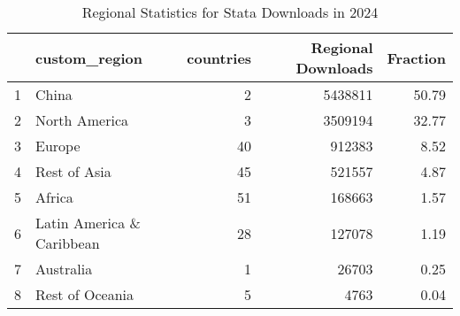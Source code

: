 \begin{table}[ht]
\centering
\begin{tabular}{rlrrr}
  \hline
 & custom\_region & countries & Regional Downloads & Fraction \\ 
  \hline
1 & China &   2 & 5438811 & 50.79 \\ 
  2 & North America &   3 & 3509194 & 32.77 \\ 
  3 & Europe &  40 & 912383 & 8.52 \\ 
  4 & Rest of Asia &  45 & 521557 & 4.87 \\ 
  5 & Africa &  51 & 168663 & 1.57 \\ 
  6 & Latin America \& Caribbean &  28 & 127078 & 1.19 \\ 
  7 & Australia &   1 & 26703 & 0.25 \\ 
  8 & Rest of Oceania &   5 & 4763 & 0.04 \\ 
   \hline
\end{tabular}
\caption{Regional Statistics for Stata Downloads in 2024} 
\label{tab:stata_downloads_regional_stats_2024}
\end{table}
